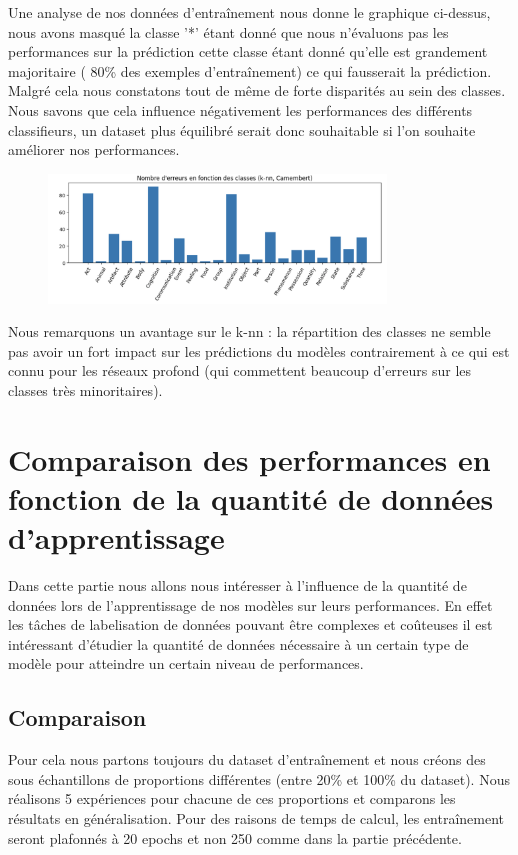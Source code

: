 \documentclass[12pt]{article}
\begin{document}
Une analyse de nos données d'entraînement nous donne le graphique ci-dessus, nous avons masqué la classe '*' étant donné que nous
n'évaluons pas les performances sur la prédiction cette classe étant donné qu'elle est grandement majoritaire ( 80\% des exemples d'entraînement) ce qui
fausserait la prédiction. Malgré cela nous constatons tout de même de forte disparités au sein des classes. Nous savons que cela 
influence négativement les performances des différents classifieurs, un dataset plus équilibré serait donc souhaitable si l'on souhaite améliorer
nos performances. 
\begin{figure}[H]
    \centering
    \includegraphics[width=0.8\textwidth]{static/stat_error.png}
\end{figure}

Nous remarquons un avantage sur le k-nn : la répartition des classes ne semble pas avoir un fort impact sur 
les prédictions du modèles contrairement à ce qui est connu pour les réseaux profond (qui commettent beaucoup d'erreurs sur les classes très minoritaires).
\section{Comparaison des performances en fonction de la quantité de données d'apprentissage}


Dans cette partie nous allons nous intéresser à l'influence de la quantité de données lors de l'apprentissage 
de nos modèles sur leurs performances. En effet les tâches de labelisation de données pouvant être complexes et coûteuses
il est intéressant d'étudier la quantité de données nécessaire à un certain type de modèle pour atteindre un certain niveau 
de performances.
\subsection{Comparaison}
Pour cela nous partons toujours du dataset d'entraînement et nous créons des sous échantillons de proportions 
différentes (entre 20\% et 100\% du dataset). Nous réalisons 5 expériences pour chacune de ces proportions et comparons les 
résultats en généralisation. Pour des raisons de temps de calcul, les entraînement seront plafonnés à 20 epochs et non 250 comme 
dans la partie précédente.
\end{document}
